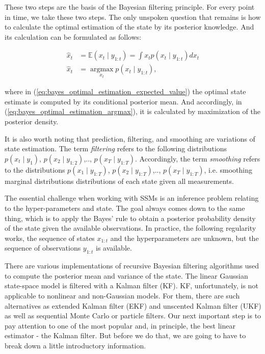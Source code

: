 These two steps are the basis of the Bayesian filtering principle. For every point in time, we take these two steps. The only unspoken question that remains is how to calculate the optimal estimation of the state by its posterior knowledge. And its calculation can be formulated as follows:

\begin{subequations}
\begin{align}
\hat{x}_t &= \mathbb{E}(x_t \mid y_{1:t}) = \int x_t p(x_t \mid y_{1:t}) dx_t \label{eq:bayes_optimal_estimation_expected_value} \\
\hat{x}_t &= \operatorname*{argmax}_{x_t} p(x_t \mid y_{1:t}), \label{eq:bayes_optimal_estimation_argmax}
\end{align}
\end{subequations}

\noindent where in (\ref{eq:bayes_optimal_estimation_expected_value}) the optimal state estimate is computed by its conditional posterior mean. And accordingly, in (\ref{eq:bayes_optimal_estimation_argmax}), it is calculated by maximization of the posterior density.

It is also worth noting that prediction, filtering, and smoothing are variations of state estimation. The term \emph{filtering} refers to the following distributions \(p(x_t \mid y_1)\), \(p(x_2 \mid y_{1:2})\),.., \(p(x_T \mid y_{1:T})\). Accordingly, the term \emph{smoothing} refers to the distributions \(p(x_1 \mid y_{1:T})\), \(p(x_2 \mid y_{1:T})\),.., \(p(x_T \mid y_{1:T})\), i.e. smoothing marginal distributions distributions of each state given all measurements.

The essential challenge when working with SSMs is an inference problem relating to the hyper-parameters and state. The goal always comes down to the same thing, which is to apply the Bayes' rule to obtain a posterior probability density of the state given the available observations. In practice, the following regularity works, the sequence of states \(x_{1:t}\) and the hyperparameters are unknown, but the sequence of observations \(y_{1:t}\) is available.

There are various implementations of recursive Bayesian filtering algorithms used to compute the posterior mean and variance of the state.
The linear Gaussian state-space model is filtered with a Kalman filter (KF). KF, unfortunately, is not applicable to nonlinear and non-Gaussian models. For them, there are such alternatives as extended Kalman filter (EKF) and unscented Kalman filter (UKF) as well as sequential Monte Carlo or particle filters. Our next important step is to pay attention to one of the most popular and, in principle, the best linear estimator - the Kalman filter. But before we do that, we are going to have to break down a little introductory information.

